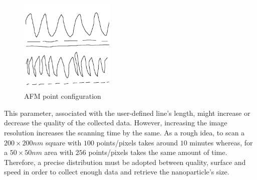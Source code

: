 \documentclass{article}
\numberwithin{equation}{section}
\begin{document}
\begin{figure}[h]
    \centering
    \includegraphics[width=0.4\textwidth, height=0.32\textwidth]{afm_scan_point_config.png}
    \caption{AFM point configuration}
    \label{fig:afm_scan_point_config}
\end{figure}
This parameter, associated with the user-defined line's length, might increase or decrease the quality of the collected data. However, increasing the image resolution increases the scanning time by the same. As a rough idea, to scan a $200 \times 200 nm$ square with $100$ points/pixels takes around $10$ minutes whereas, for a $50 \times 50 nm$ area with $256$ points/pixels takes the same amount of time. Therefore, a precise distribution must be adopted between quality, surface and speed in order to collect enough data and retrieve the nanoparticle's size.
\end{document}
